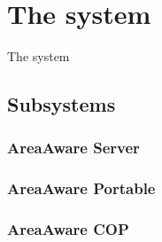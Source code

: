 \label{chp_subsystems}
\chapter{The system}
The system 

\section{Subsystems}

\subsection{AreaAware Server}

\subsection{AreaAware Portable}

\subsection{AreaAware COP}
